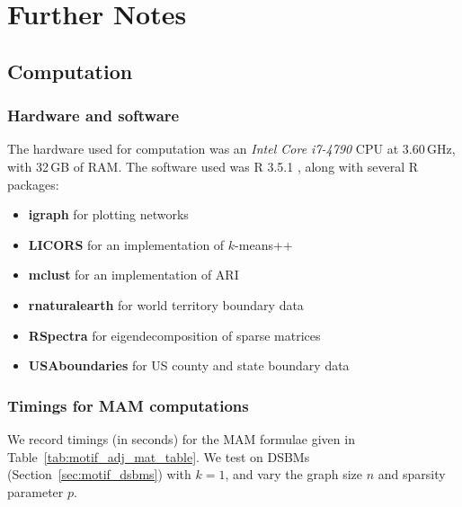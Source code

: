 \documentclass[12pt]{ociamthesis}
\theoremstyle{plain}
\theoremstyle{definition}
\theoremstyle{remark}
\begin{document}
\chapter{Further Notes}

\section{Computation} \label{sec:notes_computation}

\subsection{Hardware and software} \label{sec:notes_hardware}

The hardware used for computation was an \emph{Intel Core i7-4790} CPU at
3.60\,GHz, with 32\,GB of RAM. The software used was R 3.5.1
\cite{r_rsoftware}, along with several R packages:
%
%
\begin{itemize}
  \item \textbf{igraph} \cite{r_igraph} for plotting networks
  \item \textbf{LICORS} \cite{r_LICORS} for an implementation of $k$-means++
  \item \textbf{mclust} \cite{r_mclust} for an implementation of ARI
  \item
    \textbf{rnaturalearth} \cite{r_rnaturalearth} for world territory boundary
    data
  \item \textbf{RSpectra} \cite{r_RSpectra} for eigendecomposition of
    sparse matrices
  \item \textbf{USAboundaries} \cite{r_USAboundaries} for US
    county and state boundary data
\end{itemize}

\subsection{Timings for MAM computations} \label{sec:notes_timing}

We record timings (in seconds) for the MAM formulae given in
Table~\ref{tab:motif_adj_mat_table}. We test on DSBMs
(Section~\ref{sec:motif_dsbms}) with $k=1$, and vary the graph size $n$ and
sparsity parameter $p$.
\end{document}
